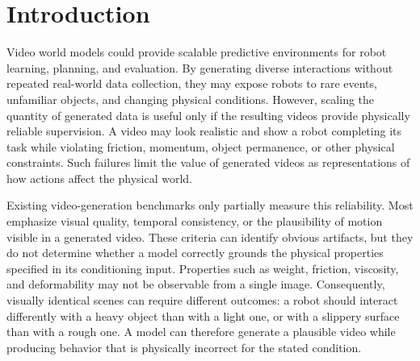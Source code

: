 \documentclass{article} %
\begin{document}
\section{Introduction}
Video world models could provide scalable predictive environments for robot learning, planning, and evaluation. By generating diverse interactions without repeated real-world data collection, they may expose robots to rare events, unfamiliar objects, and changing physical conditions. However, scaling the quantity of generated data is useful only if the resulting videos provide physically reliable supervision. A video may look realistic and show a robot completing its task while violating friction, momentum, object permanence, or other physical constraints. Such failures limit the value of generated videos as representations of how actions affect the physical world.

Existing video-generation benchmarks only partially measure this reliability. Most emphasize visual quality, temporal consistency, or the plausibility of motion visible in a generated video. These criteria can identify obvious artifacts, but they do not determine whether a model correctly grounds the physical properties specified in its conditioning input. Properties such as weight, friction, viscosity, and deformability may not be observable from a single image. Consequently, visually identical scenes can require different outcomes: a robot should interact differently with a heavy object than with a light one, or with a slippery surface than with a rough one. A model can therefore generate a plausible video while producing behavior that is physically incorrect for the stated condition.
\end{document}
